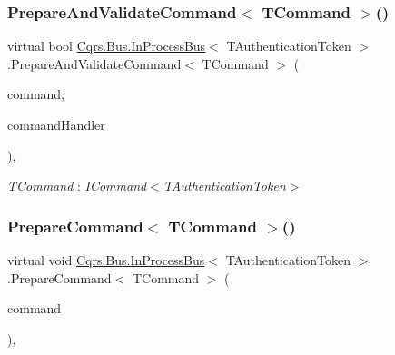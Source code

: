 \subsubsection{\texorpdfstring{Prepare\+And\+Validate\+Command$<$ T\+Command $>$()}{PrepareAndValidateCommand< TCommand >()}}
{\footnotesize\ttfamily virtual bool \hyperlink{classCqrs_1_1Bus_1_1InProcessBus}{Cqrs.\+Bus.\+In\+Process\+Bus}$<$ T\+Authentication\+Token $>$.Prepare\+And\+Validate\+Command$<$ T\+Command $>$ (\begin{DoxyParamCaption}\item[{T\+Command}]{command,  }\item[{out \hyperlink{classCqrs_1_1Bus_1_1RouteHandlerDelegate}{Route\+Handler\+Delegate}}]{command\+Handler }\end{DoxyParamCaption})\hspace{0.3cm}{\ttfamily [protected]}, {\ttfamily [virtual]}}

\begin{Desc}
\item[Type Constraints]\begin{description}
\item[{\em T\+Command} : {\em I\+Command$<$T\+Authentication\+Token$>$}]\end{description}
\end{Desc}
\mbox{\label{classCqrs_1_1Bus_1_1InProcessBus_ab0064808b1b619bee57fa5eff49bfca7_ab0064808b1b619bee57fa5eff49bfca7}} 
\subsubsection{\texorpdfstring{Prepare\+Command$<$ T\+Command $>$()}{PrepareCommand< TCommand >()}}
{\footnotesize\ttfamily virtual void \hyperlink{classCqrs_1_1Bus_1_1InProcessBus}{Cqrs.\+Bus.\+In\+Process\+Bus}$<$ T\+Authentication\+Token $>$.Prepare\+Command$<$ T\+Command $>$ (\begin{DoxyParamCaption}\item[{T\+Command}]{command }\end{DoxyParamCaption})\hspace{0.3cm}{\ttfamily [protected]}, {\ttfamily [virtual]}}

